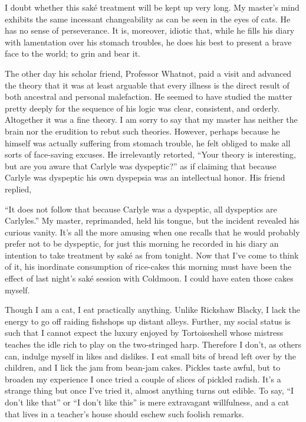 \documentclass[12pt, openright]{book}
\begin{document}
I doubt whether this saké treatment will be kept up very long. My
master's mind exhibits the same incessant changeability as can be seen
in the eyes of cats. He has no sense of perseverance. It is, moreover,
idiotic that, while he fills his diary with lamentation over his stomach
troubles, he does his best to present a brave face to the world; to grin
and bear it.

The other day his scholar friend, Professor Whatnot, paid a visit and
advanced the theory that it was at least arguable that every illness is
the direct result of both ancestral and personal malefaction. He seemed
to have studied the matter pretty deeply for the sequence of his logic
was clear, consistent, and orderly. Altogether it was a fine theory. I
am sorry to say that my master has neither the brain nor the erudition
to rebut such theories. However, perhaps because he himself was actually
suffering from stomach trouble, he felt obliged to make all sorts of
face-saving excuses. He irrelevantly retorted, ``Your theory is
interesting, but are you aware that Carlyle was dyspeptic?'' as if
claiming that because Carlyle was dyspeptic his own dyspepsia was an
intellectual honor. His friend replied,

``It does not follow that because Carlyle was a dyspeptic, all
dyspeptics are Carlyles.'' My master, reprimanded, held his tongue, but
the incident revealed his curious vanity. It's all the more amusing when
one recalls that he would probably prefer not to be dyspeptic, for just
this morning he recorded in his diary an intention to take treatment by
saké as from tonight. Now that I've come to think of it, his inordinate
consumption of rice-cakes this morning must have been the effect of last
night's saké session with Coldmoon. I could have eaten those cakes
myself.

Though I am a cat, I eat practically anything. Unlike Rickshaw Blacky, I
lack the energy to go off raiding fishshops up distant alleys. Further,
my social status is such that I cannot expect the luxury enjoyed by
Tortoiseshell whose mistress teaches the idle rich to play on the
two-stringed harp. Therefore I don't, as others can, indulge myself in
likes and dislikes. I eat small bits of bread left over by the children,
and I lick the jam from bean-jam cakes. Pickles taste awful, but to
broaden my experience I once tried a couple of slices of pickled radish.
It's a strange thing but once I've tried it, almost anything turns out
edible. To say, ``I don't like that'' or ``I don't like this'' is mere
extravagant willfulness, and a cat that lives in a teacher's house
should eschew such foolish remarks.
\end{document}
